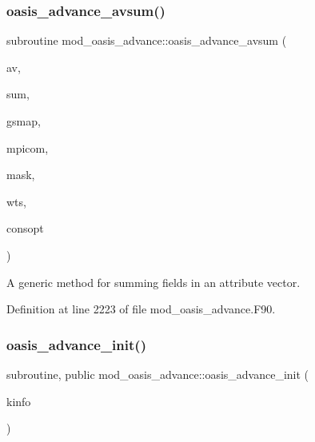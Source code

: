 \mbox{\label{namespacemod__oasis__advance_acf8f4a02082ba2d9f32f0835ad14e11d}} 
\subsubsection{\texorpdfstring{oasis\+\_\+advance\+\_\+avsum()}{oasis\_advance\_avsum()}}
{\footnotesize\ttfamily subroutine mod\+\_\+oasis\+\_\+advance\+::oasis\+\_\+advance\+\_\+avsum (\begin{DoxyParamCaption}\item[{type(mct\+\_\+avect), intent(in)}]{av,  }\item[{real(kind=ip\+\_\+r8\+\_\+p), dimension(\+:), intent(inout)}]{sum,  }\item[{type(mct\+\_\+gsmap), intent(in)}]{gsmap,  }\item[{integer(kind=ip\+\_\+i4\+\_\+p), intent(in)}]{mpicom,  }\item[{integer(kind=ip\+\_\+i4\+\_\+p), dimension(\+:), intent(in), optional}]{mask,  }\item[{real(kind=ip\+\_\+r8\+\_\+p), dimension(\+:), intent(in), optional}]{wts,  }\item[{character(len=ic\+\_\+med), intent(in), optional}]{consopt }\end{DoxyParamCaption})\hspace{0.3cm}{\ttfamily [private]}}



A generic method for summing fields in an attribute vector. 



Definition at line 2223 of file mod\+\_\+oasis\+\_\+advance.\+F90.

\mbox{\label{namespacemod__oasis__advance_a480bfe5b333300c1084af8f9c239a81d}} 
\subsubsection{\texorpdfstring{oasis\+\_\+advance\+\_\+init()}{oasis\_advance\_init()}}
{\footnotesize\ttfamily subroutine, public mod\+\_\+oasis\+\_\+advance\+::oasis\+\_\+advance\+\_\+init (\begin{DoxyParamCaption}\item[{integer(kind=ip\+\_\+i4\+\_\+p), intent(inout)}]{kinfo }\end{DoxyParamCaption})}



